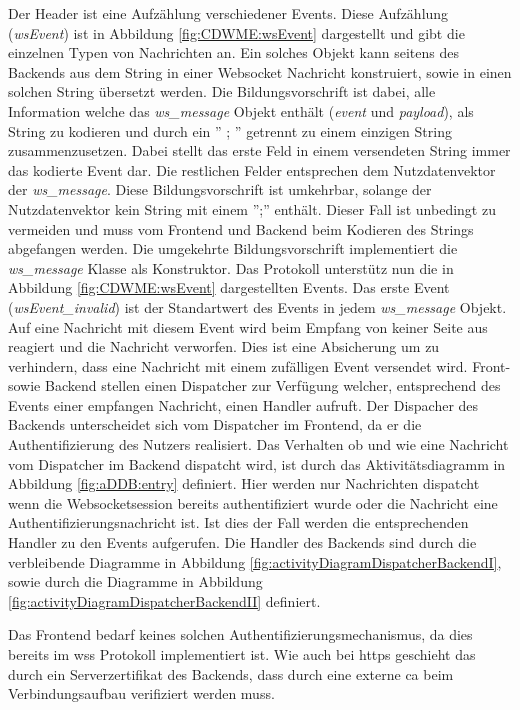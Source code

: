 Der Header ist eine Aufzählung verschiedener Events. 
Diese Aufzählung (\emph{wsEvent}) ist in Abbildung \ref{fig:CDWME:wsEvent} dargestellt und gibt die einzelnen Typen von Nachrichten an. 
Ein solches Objekt kann seitens des Backends aus dem String in einer Websocket Nachricht konstruiert, 
sowie in einen solchen String übersetzt werden. 
Die Bildungsvorschrift ist dabei, alle Information welche das \emph{ws\_message} Objekt enthält (\emph{event} und \emph{payload}), als String zu kodieren 
und durch ein '' ; '' getrennt zu einem einzigen String zusammenzusetzen.
Dabei stellt das erste Feld in einem versendeten String immer das kodierte Event dar. Die restlichen Felder entsprechen dem Nutzdatenvektor der \emph{ws\_message}.
Diese Bildungsvorschrift ist umkehrbar, solange der Nutzdatenvektor kein String mit einem '';'' enthält.
Dieser Fall ist unbedingt zu vermeiden und muss vom Frontend und Backend beim Kodieren des Strings abgefangen werden.
Die umgekehrte Bildungsvorschrift implementiert die \emph{ws\_message} Klasse als Konstruktor. 
Das Protokoll unterstütz nun die in Abbildung \ref{fig:CDWME:wsEvent} dargestellten Events.
Das erste Event (\emph{wsEvent\_invalid}) ist der Standartwert des Events in jedem \emph{ws\_message} Objekt. 
Auf eine Nachricht mit diesem Event wird beim Empfang von keiner Seite aus reagiert und die Nachricht verworfen.
Dies ist eine Absicherung um zu verhindern, dass eine Nachricht mit einem zufälligen Event versendet wird.
Front- sowie Backend stellen einen Dispatcher zur Verfügung welcher, entsprechend des Events einer empfangen Nachricht, einen Handler aufruft.
Der Dispacher des Backends unterscheidet sich vom Dispatcher im Frontend, da er die Authentifizierung des Nutzers realisiert.
Das Verhalten ob und wie eine Nachricht vom Dispatcher im Backend dispatcht wird, 
ist durch das Aktivitätsdiagramm in Abbildung \ref{fig:aDDB:entry} definiert. 
Hier werden nur Nachrichten dispatcht wenn die Websocketsession bereits authentifiziert wurde oder die Nachricht eine Authentifizierungsnachricht ist.
Ist dies der Fall werden die entsprechenden Handler zu den Events aufgerufen. 
Die Handler des Backends sind durch die verbleibende Diagramme in Abbildung \ref{fig:activityDiagramDispatcherBackendI}, 
sowie durch die Diagramme in Abbildung \ref{fig:activityDiagramDispatcherBackendII} definiert.

Das Frontend bedarf keines solchen Authentifizierungsmechanismus, da dies bereits im \ac{wss} Protokoll implementiert ist. 
Wie auch bei \ac{https} geschieht das durch ein Serverzertifikat des Backends, dass durch eine externe \ac{ca} beim Verbindungsaufbau verifiziert werden muss.

